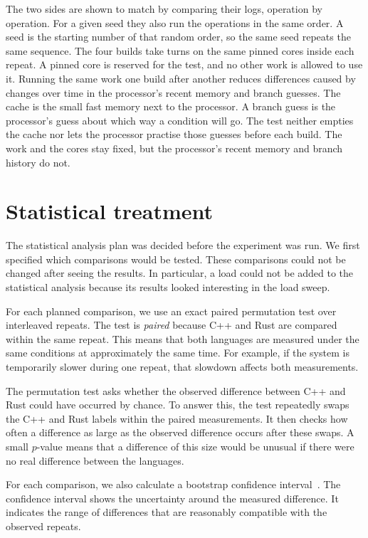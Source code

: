 \documentclass[english,oneside,a4paper,censored,csm,software-track-2020]{HYthesisML}
\begin{document}
The two sides are shown to match by comparing their logs, operation by
operation. For a given seed they also run the operations in the same order.
A seed is the starting number of that random order, so the same seed repeats
the same sequence. The four builds take turns on the same pinned cores
inside each repeat. A pinned core is reserved for the test, and no other work
is allowed to use it. Running the same work one build after another reduces
differences caused by changes over time in the processor's recent memory and
branch guesses. The cache is the small fast memory next to the processor. A
branch guess is the processor's guess about which way a condition will go.
The test neither empties the cache nor lets the processor practise those
guesses before each build. The work and the cores stay fixed, but the
processor's recent memory and branch history do not.

\section{Statistical treatment}\label{sec:statsbrief}
The statistical analysis plan was decided before the experiment was run. We first
specified which comparisons would be tested. These comparisons could not be changed
after seeing the results. In particular, a load could not be added to the statistical
analysis because its results looked interesting in the load sweep.

For each planned comparison, we use an exact paired permutation test over \NRepeats{}
interleaved repeats. The test is \emph{paired} because C++ and Rust are compared
within the same repeat. This means that both languages are measured under the same
conditions at approximately the same time. For example, if the system is temporarily
slower during one repeat, that slowdown affects both measurements.

The permutation test asks whether the observed difference between C++ and Rust could
have occurred by chance. To answer this, the test repeatedly swaps the C++ and Rust
labels within the paired measurements. It then checks how often a difference as large
as the observed difference occurs after these swaps. A small $p$-value means that a
difference of this size would be unusual if there were no real difference between
the languages.

For each comparison, we also calculate a bootstrap confidence
interval~\cite{efron1993bootstrap}. The confidence interval shows the uncertainty
around the measured difference. It indicates the range of differences that are
reasonably compatible with the observed repeats.
\end{document}
